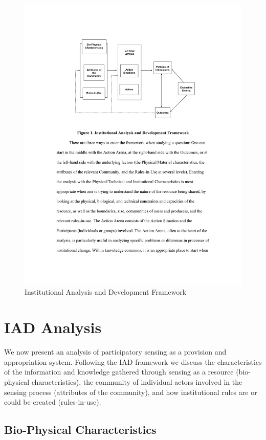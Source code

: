 \begin{figure}
\caption[Institutional Analysis and Development Framework]{Institutional Analysis and Development Framework~\protect\cite[p.44]{Ostrom2007a}}\label{fig:iad}
\includegraphics[width=\linewidth]{gfx/IAD.pdf}
\end{figure}

\section{IAD Analysis}

We now present an analysis of participatory sensing as a provision and appropriation system. 
Following the \ac{IAD} framework we discuss the characteristics of the information and knowledge gathered through sensing as a resource (bio-physical characteristics), the community of individual actors involved in the sensing process (attributes of the community), and how institutional rules are or could be created (rules-in-use).

\subsection{Bio-Physical Characteristics}

